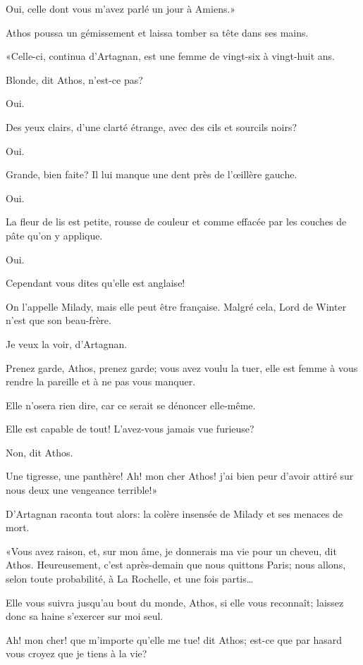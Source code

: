 \speak  Oui, celle dont vous m'avez parlé un jour à Amiens.» 

Athos poussa un gémissement et laissa tomber sa tête dans ses mains. 

«Celle-ci, continua d'Artagnan, est une femme de vingt-six à vingt-huit ans. 

\speak  Blonde, dit Athos, n'est-ce pas? 

\speak  Oui. 

\speak  Des yeux clairs, d'une clarté étrange, avec des cils et sourcils noirs? 

\speak  Oui. 

\speak  Grande, bien faite? Il lui manque une dent près de l'œillère gauche. 

\speak  Oui. 

\speak  La fleur de lis est petite, rousse de couleur et comme effacée par les couches de pâte qu'on y applique. 

\speak  Oui. 

\speak  Cependant vous dites qu'elle est anglaise! 

\speak  On l'appelle Milady, mais elle peut être française. Malgré cela, Lord de Winter n'est que son beau-frère. 

\speak  Je veux la voir, d'Artagnan. 

\speak  Prenez garde, Athos, prenez garde; vous avez voulu la tuer, elle est femme à vous rendre la pareille et à ne pas vous manquer. 

\speak  Elle n'osera rien dire, car ce serait se dénoncer elle-même. 

\speak  Elle est capable de tout! L'avez-vous jamais vue furieuse? 

\speak  Non, dit Athos. 

\speak  Une tigresse, une panthère! Ah! mon cher Athos! j'ai bien peur d'avoir attiré sur nous deux une vengeance terrible!» 

D'Artagnan raconta tout alors: la colère insensée de Milady et ses menaces de mort. 

«Vous avez raison, et, sur mon âme, je donnerais ma vie pour un cheveu, dit Athos. Heureusement, c'est après-demain que nous quittons Paris; nous allons, selon toute probabilité, à La Rochelle, et une fois partis\dots 

\speak  Elle vous suivra jusqu'au bout du monde, Athos, si elle vous reconnaît; laissez donc sa haine s'exercer sur moi seul. 

\speak  Ah! mon cher! que m'importe qu'elle me tue! dit Athos; est-ce que par hasard vous croyez que je tiens à la vie? 

